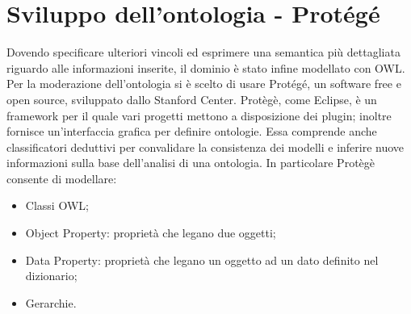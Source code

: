 \chapter{Sviluppo dell'ontologia - Protégé}
Dovendo specificare ulteriori vincoli ed esprimere una semantica più dettagliata riguardo alle informazioni inserite, il dominio è stato infine modellato con OWL.
\\
Per la moderazione dell’ontologia si è scelto di usare Protégé, un software free e open source, sviluppato dallo Stanford Center. Protègè, come Eclipse, è un framework per il quale vari progetti mettono a disposizione dei plugin; inoltre fornisce un'interfaccia grafica per definire ontologie. Essa comprende anche classificatori deduttivi per convalidare la consistenza dei modelli e inferire nuove informazioni sulla base dell'analisi di una ontologia. In particolare Protègè consente di modellare:
\begin{itemize}
\item Classi OWL;
\item Object Property: proprietà che legano due oggetti;
\item Data Property: proprietà che legano un oggetto ad un dato definito nel dizionario;
\item Gerarchie.
\end{itemize}
